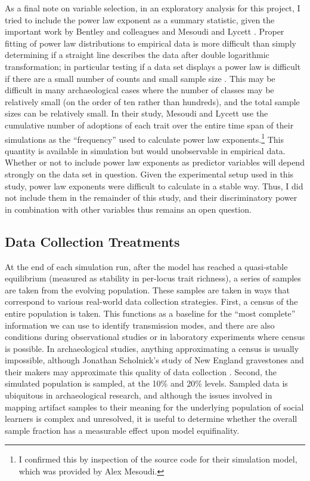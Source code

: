 As a final note on variable selection, in an exploratory analysis for this
project, I tried to include the power law exponent as a summary statistic, given the important work by Bentley and colleagues
\citeyearpar{bentley2004random} and Mesoudi and Lycett
\citeyearpar{Mesoudi2009}.  Proper fitting of power law distributions to empirical data is more difficult than simply determining if a straight line describes the data after double logarithmic transformation; in particular testing if a data set displays a power law is difficult if there are a small number of counts and small sample size \citep{clauset2007power}.  This may be difficult in many archaeological cases where the number of classes may be relatively small (on the order of ten rather than hundreds), and the total sample sizes can be relatively small.  In their study, Mesoudi and Lycett
\citeyearpar{Mesoudi2009} use the cumulative number of adoptions of each
trait over the entire time span of their simulations as the ``frequency''
used to calculate power law
exponents.\footnote{I confirmed this by inspection of the source code for their simulation model, which was provided by Alex Mesoudi.}  This quantity is available in simulation but would unobservable in empirical data.  Whether or not to include power law exponents as predictor variables will depend strongly on the data set in question.  Given the experimental setup used in this study, power law exponents were difficult to calculate in a stable way.  Thus, I did not include them in the remainder of this study, and their discriminatory power in combination with other variables thus remains an open question.

\subsection{Data Collection Treatments}\label{data-collection-treatments}

At the end of each simulation run, after the model has reached a quasi-stable equilibrium (measured as stability in per-locus trait richness), a series of samples are taken from the evolving population.  These samples are taken in ways that correspond to various real-world data collection strategies.  First, a census of the entire population is taken.  This functions as a baseline for the ``most complete'' information we can use to identify transmission modes, and there are also conditions during observational studies or in laboratory experiments where census is possible.  In archaeological studies, anything approximating a census is usually impossible, although Jonathan Scholnick's study of New England gravestones and their makers may approximate this quality of data collection \citep{scholnick2012spatial}.  Second, the simulated population is sampled, at the 10\% and 20\% levels.  Sampled data is ubiquitous in archaeological research, and although the issues involved in mapping artifact samples to their meaning for the underlying population of social learners is complex and unresolved, it is useful to determine whether the overall sample fraction has a measurable effect upon model equifinality.  

